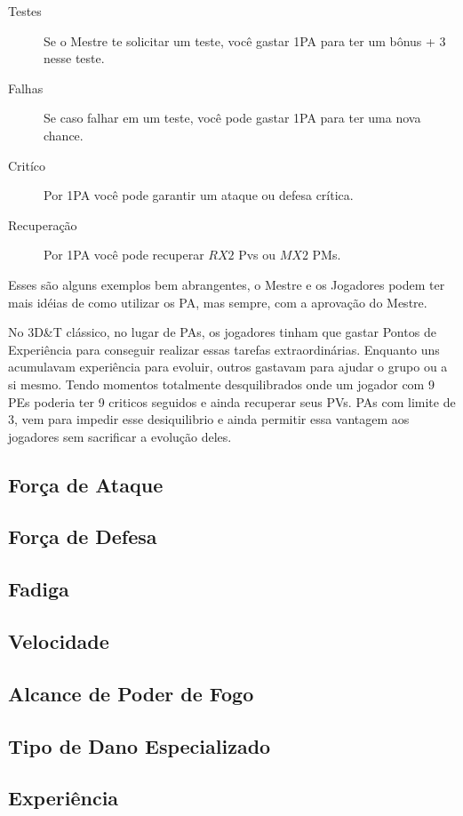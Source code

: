 \begin{description}
\item[Testes] Se o Mestre te solicitar um teste, você gastar 1PA para ter um bônus + 3 nesse teste. 
\item[Falhas] Se caso falhar em um teste, você pode gastar 1PA para ter uma nova chance.
\item[Critíco] Por 1PA você pode garantir um ataque ou defesa crítica.
\item[Recuperação] Por 1PA você pode recuperar \(RX2\) Pvs ou \(MX2\) PMs.
\end{description}

Esses são alguns exemplos bem abrangentes, o Mestre e os Jogadores podem ter mais idéias de como utilizar os PA, mas sempre, com a aprovação do Mestre.

\begin{framed}
No 3D\&T clássico, no lugar de PAs, os jogadores tinham que gastar Pontos de Experiência para conseguir realizar essas tarefas extraordinárias. Enquanto uns acumulavam experiência para evoluir, outros gastavam para ajudar o grupo ou a si mesmo. Tendo momentos totalmente desquilibrados onde um jogador com 9 PEs poderia ter 9 criticos seguidos e ainda recuperar seus PVs. PAs com limite de 3, vem para impedir esse desiquilibrio e ainda permitir essa vantagem aos jogadores sem sacrificar a evolução deles. 
\end{framed}

\subsection{Força de Ataque}

\subsection{Força de Defesa}

\subsection{Fadiga}

\subsection{Velocidade}

\subsection{Alcance de Poder de Fogo}

\subsection{Tipo de Dano Especializado}

\subsection{Experiência}
